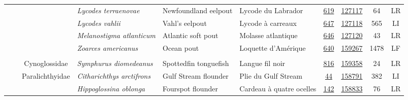 \documentclass[12pt]{article}\usepackage[]{graphicx}\usepackage[]{color}
\begin{document}
\begin{landscapepage}
\begin{longtable}[t]{ccc>{\centering\arraybackslash}p{3cm}>{\centering\arraybackslash}p{3cm}>{\centering\arraybackslash}p{3cm}>{}c>{}ccc}
\hspace{1em}\hspace{1em} &  &  & \em{Lycodes terraenovae} & Newfoundland eelpout & Lycode du Labrador & \href{#sec:619}{619} & \href{http://www.marinespecies.org/aphia.php?p=taxdetails&id=127117}{127117} & 64 & LR\\
\hspace{1em}\hspace{1em} &  &  & \em{Lycodes vahlii} & Vahl's eelpout & Lycode à carreaux & \href{#sec:647}{647} & \href{http://www.marinespecies.org/aphia.php?p=taxdetails&id=127118}{127118} & 565 & LI\\
\hspace{1em}\hspace{1em} &  &  & \em{Melanostigma atlanticum} & Atlantic soft pout & Molasse atlantique & \href{#sec:646}{646} & \href{http://www.marinespecies.org/aphia.php?p=taxdetails&id=127120}{127120} & 43 & LR\\
\hspace{1em}\hspace{1em} &  &  & \em{Zoarces americanus} & Ocean pout & Loquette d'Amérique & \href{#sec:640}{640} & \href{http://www.marinespecies.org/aphia.php?p=taxdetails&id=159267}{159267} & 1478 & LF\\
\addlinespace[0.3em]
\\
\hspace{1em}\hspace{1em} &  & Cynoglossidae & \em{Symphurus diomedeanus} & Spottedfin tonguefish & Langue fil noir & \href{#sec:816}{816} & \href{http://www.marinespecies.org/aphia.php?p=taxdetails&id=159358}{159358} & 24 & LR\\
\hspace{1em}\hspace{1em} &  & Paralichthyidae & \em{Citharichthys arctifrons} & Gulf Stream flounder & Plie du Gulf Stream & \href{#sec:44}{44} & \href{http://www.marinespecies.org/aphia.php?p=taxdetails&id=158791}{158791} & 382 & LI\\
\hspace{1em}\hspace{1em} &  &  & \em{Hippoglossina oblonga} & Fourspot flounder & Cardeau à quatre ocelles & \href{#sec:142}{142} & \href{http://www.marinespecies.org/aphia.php?p=taxdetails&id=158833}{158833} & 76 & LR\\

\end{longtable}
\end{landscapepage}
\end{document}
